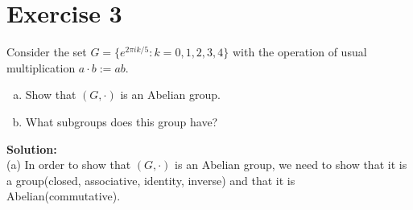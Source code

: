 \documentclass{article}
\begin{document}
\newpage

\section*{Exercise 3}

Consider the set $G=\{e^{2\pi i k/5} : k=0,1,2,3,4\}$ with the operation of usual multiplication $a \cdot b := ab$.
\begin{enumerate}[(a)]
\item Show that $(G,\cdot)$ is an Abelian group.
\item What subgroups does this group have?
\end{enumerate}

\textbf{Solution:}\\

(a) In order to show that $(G,\cdot)$ is an Abelian group, we need to show that it is a group(closed, associative, identity, inverse) and that it is Abelian(commutative).
\end{document}
